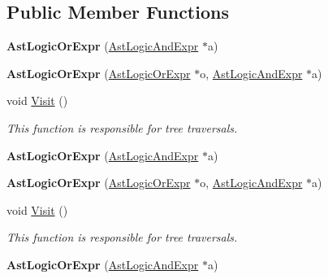 \subsection*{Public Member Functions}
\begin{DoxyCompactItemize}
\item 
\hypertarget{classAstLogicOrExpr_a9e3103b546a45090ba81ae88fe72b72e}{{\bfseries Ast\-Logic\-Or\-Expr} (\hyperlink{classAstLogicAndExpr}{Ast\-Logic\-And\-Expr} $\ast$a)}\label{classAstLogicOrExpr_a9e3103b546a45090ba81ae88fe72b72e}

\item 
\hypertarget{classAstLogicOrExpr_ade933ad4ec401ffc0dabfb19706fb341}{{\bfseries Ast\-Logic\-Or\-Expr} (\hyperlink{classAstLogicOrExpr}{Ast\-Logic\-Or\-Expr} $\ast$o, \hyperlink{classAstLogicAndExpr}{Ast\-Logic\-And\-Expr} $\ast$a)}\label{classAstLogicOrExpr_ade933ad4ec401ffc0dabfb19706fb341}

\item 
void \hyperlink{classAstLogicOrExpr_acdcdda8eae9c03d8175bbb3527c783eb}{Visit} ()
\begin{DoxyCompactList}\small\item\em This function is responsible for tree traversals. \end{DoxyCompactList}\item 
\hypertarget{classAstLogicOrExpr_a9e3103b546a45090ba81ae88fe72b72e}{{\bfseries Ast\-Logic\-Or\-Expr} (\hyperlink{classAstLogicAndExpr}{Ast\-Logic\-And\-Expr} $\ast$a)}\label{classAstLogicOrExpr_a9e3103b546a45090ba81ae88fe72b72e}

\item 
\hypertarget{classAstLogicOrExpr_ade933ad4ec401ffc0dabfb19706fb341}{{\bfseries Ast\-Logic\-Or\-Expr} (\hyperlink{classAstLogicOrExpr}{Ast\-Logic\-Or\-Expr} $\ast$o, \hyperlink{classAstLogicAndExpr}{Ast\-Logic\-And\-Expr} $\ast$a)}\label{classAstLogicOrExpr_ade933ad4ec401ffc0dabfb19706fb341}

\item 
void \hyperlink{classAstLogicOrExpr_acdcdda8eae9c03d8175bbb3527c783eb}{Visit} ()
\begin{DoxyCompactList}\small\item\em This function is responsible for tree traversals. \end{DoxyCompactList}\item 
\hypertarget{classAstLogicOrExpr_a9e3103b546a45090ba81ae88fe72b72e}{{\bfseries Ast\-Logic\-Or\-Expr} (\hyperlink{classAstLogicAndExpr}{Ast\-Logic\-And\-Expr} $\ast$a)}\label{classAstLogicOrExpr_a9e3103b546a45090ba81ae88fe72b72e}


\end{DoxyCompactItemize}
